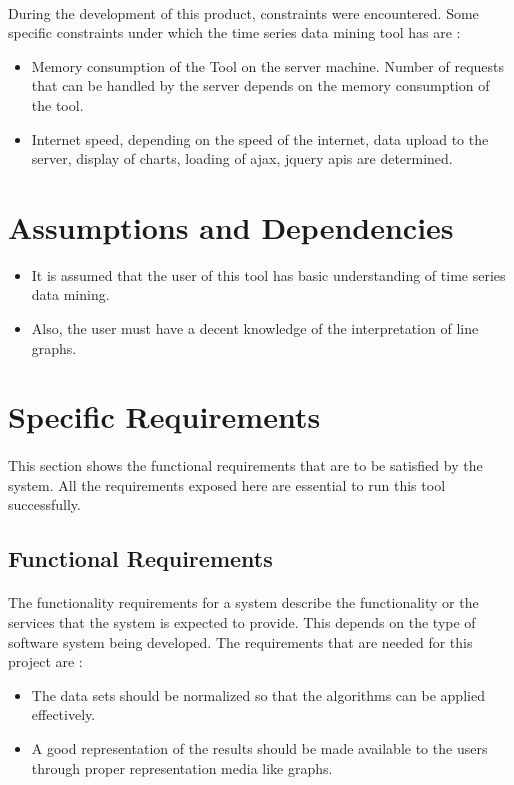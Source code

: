 \documentclass[12pt,a4paper]{report}
\begin{document}
\paragraph{}During the development of this product, constraints were encountered. Some specific constraints under which the time series data mining tool has are :

\begin{itemize} 
\item{} Memory consumption of the Tool on the server machine. Number of requests that can be handled by the server depends on the memory consumption of the tool.
\item{} Internet speed, depending on the speed of the internet, data upload to the server, display of charts, loading of ajax, jquery apis are determined.
\end{itemize}

\section{Assumptions and Dependencies}
 \begin{itemize}
\item{}It is assumed that the user of this tool has basic understanding of time series data mining.
 
\item{}Also, the user must have a decent knowledge of the interpretation of line graphs.
\end{itemize}

\section{Specific Requirements}
\paragraph{}This section shows the functional requirements that are to be satisfied by the system. All the requirements exposed here are essential to run this tool successfully.

\subsection{Functional Requirements}
\paragraph{}The functionality requirements for a system describe the functionality or the services that the system is expected to provide. This depends on the type of software system being developed. 
The requirements that are needed for this project are :
 \begin{itemize}
\item The data sets should be normalized so that the algorithms can be applied effectively.
\item A good representation of the results should be made available to the users through proper representation media like graphs.
\end{itemize}
\end{document}
